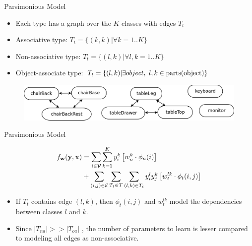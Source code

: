 \documentclass{beamer}
\newcommand{\x}{{\mathbf x}}     %
\newcommand{\y}{{\mathbf y}}     %
\newcommand{\ysc}[2]{{y_{#1}^{#2}}}    %
\newcommand{\fn}[1]{{\phi_n(#1)}}      %
\newcommand{\fe}[3]{{\phi_{#1}(#2,#3)}}%
\newcommand{\w}{{\mathbf w}}           %
\newcommand{\wn}[1]{{w_n^{#1}}}        %
\newcommand{\we}[3]{{w_{#1}^{#2#3}}}   %
\newcommand{\df}[3]{{f_{#3}(#1,#2)}}   %
\begin{document}
\begin{frame}{Parsimonious Model}
\begin{itemize}

\item Each type has a graph over the $K$ classes with edges  $T_t$

\item Associative type:  ${T_t}=\{(k,k)| \forall k=1..K\}$
\item Non-associative type: $T_t=\{(l,k)| \forall l,k=1..K\}$
\item Object-associate type: $T_t=\{(l,k) | \exists object , ~ l,k\in {\rm parts}({\rm object})\}$
\end{itemize}
\hskip 1in
\begin{figure}
		\includegraphics[width=.8\linewidth]{objAssoc.png}
	\end{figure}


\end{frame}

\begin{frame}{Parsimonious Model}




\begin{equation} \label{eq:model}
\begin{split}
\df{\y}{\x}{\w} & = \sum_{i \in \mathcal{V}} \sum_{k=1}^{K} \ysc{i}{k} \left[\wn{k} \cdot \fn{i} \right] \\
 & + \sum_{(i,j)\in \mathcal{E}}   \sum_{T_t \in {\cal T}}  \sum_{(l,k)\in T_t} \ysc{i}{l} \ysc{j}{k}  \left[\we{t}{l}{k} \cdot \fe{t}{i}{j}\right] 
 \end{split}
\end{equation}
\begin{itemize}
\item If $T_t$ contains edge $(l,k)$, then $\fe{t}{i}{j}$ and $\we{t}{l}{k}$  model the dependencies between classes $l$ and $k$.
\item Since $|T_{na}| >> |T_{oa}|$ , the number of parameters to learn is lesser compared to modeling all edges as non-associative.

\end{itemize}
\end{frame}
\end{document}

